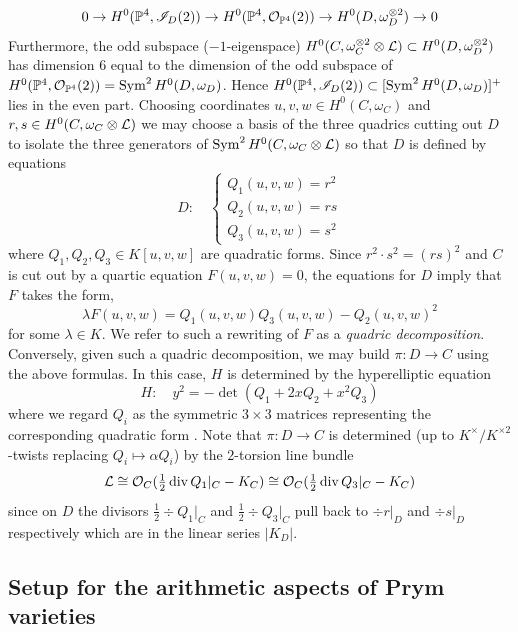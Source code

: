 \documentclass[main.tex]{subfiles}
\begin{document}
\[ 0 \to H^0(\mathbb{P}^4, \mathscr{I}_D(2)) \to H^0(\mathbb{P}^4, \mathcal{O}_{\mathbb{P}^4}(2)) \to H^0(D, \omega_D^{\otimes 2}) \to 0 \]
Furthermore, the odd subspace ($-1$-eigenspace) $H^0(C, \omega_C^{\otimes 2} \otimes \mathcal{L}) \subset H^0(D, \omega_D^{\otimes 2})$ has dimension $6$ equal to the dimension of the odd subspace of $H^0(\mathbb{P}^4, \mathcal{O}_{\mathbb{P}^4}(2)) = \operatorname{\mathrm{Sym}}^2 H^0(D, \omega_D)$. Hence $H^0(\mathbb{P}^4, \mathscr{I}_D(2)) \subset [\operatorname{\mathrm{Sym}}^2 H^0(D, \omega_D)]^{+}$ lies in the even part. Choosing coordinates $u,v,w \in H^0(C, \omega_C)$ and $r,s \in H^0(C, \omega_C \otimes \mathcal{L})$ we may choose a basis of the three quadrics cutting out $D$ to isolate the three generators of $\operatorname{\mathrm{Sym}}^2 H^0(C, \omega_C \otimes \mathcal{L})$ so that $D$ is defined by equations
\[ D : \quad 
\begin{cases}
Q_1(u,v,w) = r^2
\\
Q_2(u,v,w) = rs
\\
Q_3(u,v,w) = s^2
\end{cases} \]
where $Q_1, Q_2, Q_3 \in K[u,v,w]$ are quadratic forms. 
Since $r^2 \cdot s^2 = (rs)^2$ and $C$ is cut out by a quartic equation $F(u,v,w) = 0$, the equations for $D$ imply that $F$ takes the form,
\[ \lambda F(u,v,w) = Q_1(u,v,w) Q_3(u,v,w) - Q_2(u,v,w)^2 \]
for some $\lambda \in K$. We refer to such a rewriting of $F$ as a \textit{quadric decomposition}. Conversely, given such a quadric decomposition, we may build $\pi : D \to C$ using the above formulas. In this case, $H$ is determined by the hyperelliptic equation
\[ H : \quad y^2 = -\det{(Q_1 + 2 x Q_2 + x^2 Q_3)} \]
where we regard $Q_i$ as the symmetric $3 \times 3$ matrices representing the corresponding quadratic form \cite{bruin:prym_genus_3}. Note that $\pi : D \to C$ is determined (up to $K^{\times} / K^{\times 2}$-twists replacing $Q_i \mapsto \alpha Q_i$) by the $2$-torsion line bundle
\[ \mathcal{L} \cong \mathcal{O}_C(\tfrac{1}{2} \operatorname{\mathrm{div}}{Q_1|_C} - K_C) \cong \mathcal{O}_C(\tfrac{1}{2} \operatorname{\mathrm{div}}{Q_3|_C} - K_C) \]
since on $D$ the divisors $\tfrac{1}{2} \div{Q_1|_C}$ and $\tfrac{1}{2} \div{Q_3|_C}$ pull back to $\div{r|_D}$ and $\div{s|_D}$ respectively which are in the linear series $|K_D|$.

\subsection{Setup for the arithmetic aspects of Prym varieties}
\end{document}
